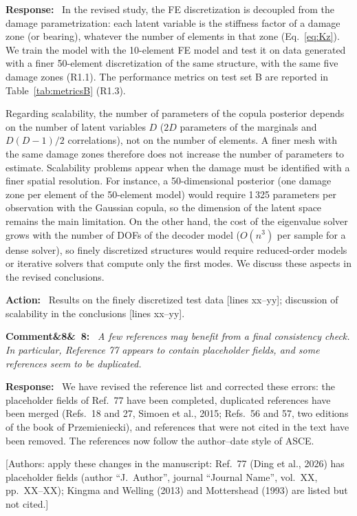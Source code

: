\documentclass[11pt]{article}
\newenvironment{rcomment}[1]{\par\bigskip\noindent\textbf{Comment\ifx&#1&\else\ #1\fi:}\ \itshape}{\par}
\newenvironment{response}{\par\smallskip\noindent\color{resp}\textbf{Response:}\ }{\par}
\newenvironment{action}{\par\smallskip\noindent\color{resp}\textbf{Action:}\ }{\par}
\newcommand{\authornote}[1]{\textcolor{note}{\textsf{[Authors: #1]}}}
\newcommand{\tbd}[1]{\textcolor{note}{\textsf{[#1]}}}
\newcommand{\lines}[1]{\tbd{lines #1}}
\begin{document}
\begin{response}
In the revised study, the FE discretization is decoupled from the damage parametrization: each latent variable is the
stiffness factor of a damage zone (or bearing), whatever the number of elements in that zone (Eq.~\eqref{eq:Kz}). We train
the model with the 10-element FE model and test it on data generated with a finer 50-element discretization of the same
structure, with the same five damage zones (R1.1).
The performance metrics on test set B are reported in Table~\ref{tab:metricsB} (R1.3).

Regarding scalability, the number of parameters of the copula posterior depends on the number of latent variables $D$
($2D$ parameters of the marginals and $D(D-1)/2$ correlations), not on the number of elements. A finer mesh with the same
damage zones therefore does not increase the number of parameters to estimate. Scalability problems appear when the damage
must be identified with a finer spatial resolution. For instance, a 50-dimensional posterior (one damage zone per element of
the 50-element model) would require 1\,325 parameters per observation with the Gaussian copula, so the dimension of the latent space
remains the main limitation. On the other hand, the cost of the
eigenvalue solver grows with the number of DOFs of the decoder model ($O(n^3)$ per sample for a dense solver), so finely
discretized structures would require reduced-order models or iterative solvers that compute only the first modes. We
discuss these aspects in the revised conclusions.
\end{response}

\begin{action}
Results on the finely discretized test data \lines{xx--yy}; discussion of scalability in the conclusions
\lines{xx--yy}.
\end{action}

\begin{rcomment}{8}
A few references may benefit from a final consistency check. In particular, Reference 77 appears to contain placeholder fields, and some references seem to be duplicated.
\end{rcomment}

\begin{response}
We have revised the reference list and corrected these errors: the placeholder fields of Ref.~77 have been completed,
duplicated references have been merged (Refs.~18 and 27, Simoen et al., 2015; Refs.~56 and 57, two editions of the book
of Przemieniecki), and references that were not cited in the text have been removed. The references now follow the
author--date style of ASCE.
\end{response}
\authornote{apply these changes in the manuscript: Ref.~77 (Ding et al., 2026) has placeholder fields (author ``J.~Author'',
journal ``Journal Name'', vol.~XX, pp.~XX--XX); Kingma and Welling (2013) and Mottershead (1993) are listed but not
cited.}
\end{document}
